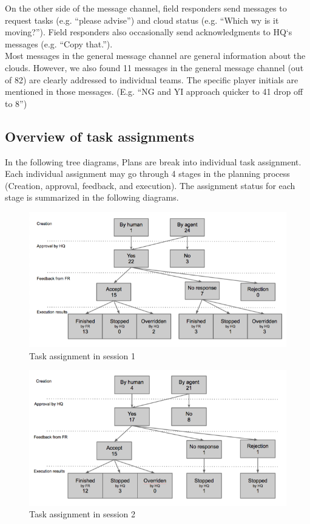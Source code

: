 On the other side of the message channel, field responders send messages to request tasks (e.g. ``please advise'') and cloud status (e.g. ``Which wy is it moving?''). Field responders also occasionally send acknowledgments to HQ`s messages (e.g. ``Copy that.''). \\

Most messages in the general message channel are general information about the clouds. However, we also found 11 messages in the general message channel (out of 82) are clearly addressed to individual teams. The specific player initials are mentioned in those messages. (E.g. ``NG and YI approach quicker to 41 drop off to 8'')\\

\subsection{Overview of task assignments}
In the following tree diagrams, Plans are break into individual task assignment. Each individual assignment may go through 4 stages in the planning process (Creation, approval, feedback, and execution). The assignment status for each stage is summarized in the following diagrams. \\

\begin{figure}[ht]
 \includegraphics[width=1\textwidth]{img/study3/TaskAsSession1}
\caption{Task assignment in session 1}
\label{fig:TaskAsSession1}
\end{figure}

\begin{figure}[ht]
 \includegraphics[width=1\textwidth]{img/study3/TaskAsSession2}
\caption{Task assignment in session 2}
\label{fig:TaskAsSession2}
\end{figure}

